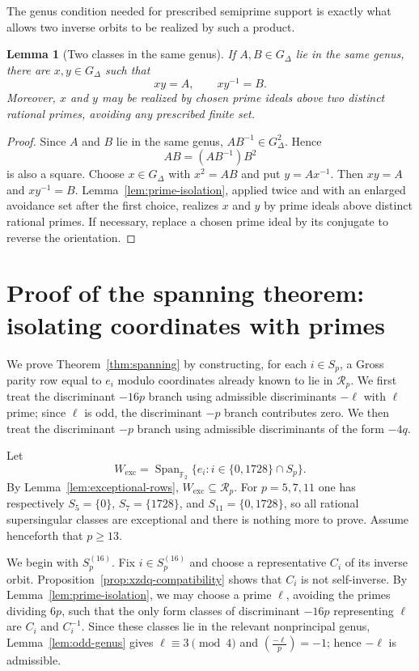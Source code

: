 \documentclass[10pt,a4paper]{amsart}
\newtheorem{lemma}[theorem]{Lemma}
\newcommand{\leg}[2]{\left(\frac{#1}{#2}\right)}
\newcommand{\Rp}{\mathcal{R}_p}
\begin{document}
The genus condition needed for prescribed semiprime support is exactly what allows two inverse orbits to be realized by such a product.

\begin{lemma}[Two classes in the same genus]\label{lem:pair-realization}
If $A,B\in G_\Delta$ lie in the same genus, there are $x,y\in G_\Delta$ such that
\[
  xy=A,
  \qquad
  xy^{-1}=B.
\]
Moreover, $x$ and $y$ may be realized by chosen prime ideals above two distinct rational primes, avoiding any prescribed finite set.
\end{lemma}

\begin{proof}
Since $A$ and $B$ lie in the same genus, $AB^{-1}\in G_\Delta^2$.  Hence
\[
  AB=(AB^{-1})B^2
\]
is also a square.  Choose $x\in G_\Delta$ with $x^2=AB$ and put $y=Ax^{-1}$.  Then $xy=A$ and $xy^{-1}=B$.  Lemma~\ref{lem:prime-isolation}, applied twice and with an enlarged avoidance set after the first choice, realizes $x$ and $y$ by prime ideals above distinct rational primes.  If necessary, replace a chosen prime ideal by its conjugate to reverse the orientation.
\end{proof}


\section{Proof of the spanning theorem: isolating coordinates with primes}\label{sec:spanning-proof}

We prove Theorem~\ref{thm:spanning} by constructing, for each
$i\in S_p$, a Gross parity row equal to $e_i$ modulo coordinates already
known to lie in $\Rp$. We first treat the discriminant $-16p$ branch using
admissible discriminants $-\ell$ with $\ell$ prime; since $\ell$ is odd,
the discriminant $-p$ branch contributes zero. We then treat the
discriminant $-p$ branch using admissible discriminants of the form $-4q$.

Let
\[
W_{\mathrm{exc}}
=
\operatorname{Span}_{\mathbb F_2}
\{e_i : i\in \{0,1728\}\cap S_p\}.
\]
By Lemma~\ref{lem:exceptional-rows}, $W_{\mathrm{exc}}\subseteq\Rp$.  For $p=5,7,11$ one has respectively $S_5=\{0\}$, $S_7=\{1728\}$, and $S_{11}=\{0,1728\}$, so all rational supersingular classes are exceptional and there is nothing more to prove.  Assume henceforth that $p\ge13$.

We begin with $S_p^{(16)}$.  Fix $i\in S_p^{(16)}$ and choose a representative $C_i$ of its inverse orbit.  Proposition~\ref{prop:xzdq-compatibility} shows that $C_i$ is not self-inverse.  By Lemma~\ref{lem:prime-isolation}, we may choose a prime $\ell$, avoiding the primes dividing $6p$, such that the only form classes of discriminant $-16p$ representing $\ell$ are $C_i$ and $C_i^{-1}$.  Since these classes lie in the relevant nonprincipal genus, Lemma~\ref{lem:odd-genus} gives $\ell\equiv3\pmod4$ and $\leg{-\ell}{p}=-1$; hence $-\ell$ is admissible.
\end{document}
